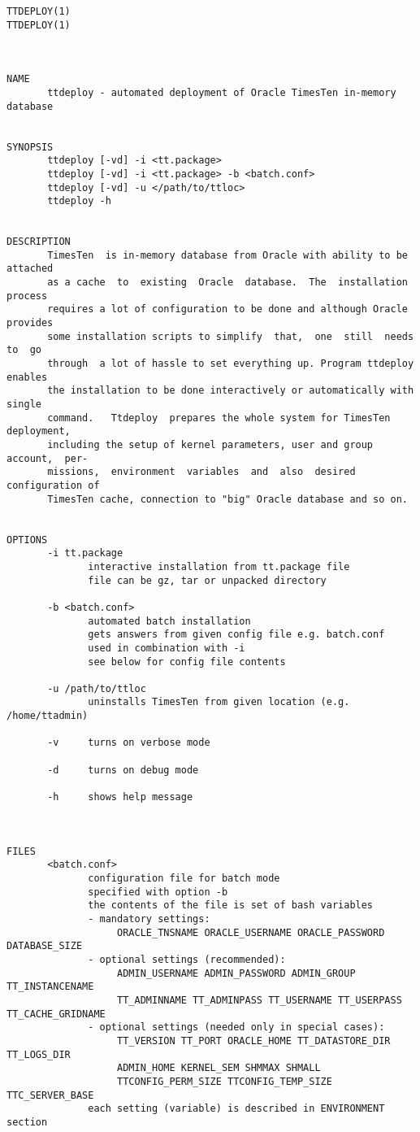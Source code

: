 \documentclass[11pt, letterpaper]{article}
\begin{document}
\begin{lstlisting}
TTDEPLOY(1)                                                        TTDEPLOY(1)



NAME
       ttdeploy - automated deployment of Oracle TimesTen in-memory database


SYNOPSIS
       ttdeploy [-vd] -i <tt.package>
       ttdeploy [-vd] -i <tt.package> -b <batch.conf>
       ttdeploy [-vd] -u </path/to/ttloc>
       ttdeploy -h


DESCRIPTION
       TimesTen  is in-memory database from Oracle with ability to be attached
       as a cache  to  existing  Oracle  database.  The  installation  process
       requires a lot of configuration to be done and although Oracle provides
       some installation scripts to simplify  that,  one  still  needs  to  go
       through  a lot of hassle to set everything up. Program ttdeploy enables
       the installation to be done interactively or automatically with  single
       command.   Ttdeploy  prepares the whole system for TimesTen deployment,
       including the setup of kernel parameters, user and group account,  per-
       missions,  environment  variables  and  also  desired  configuration of
       TimesTen cache, connection to "big" Oracle database and so on.


OPTIONS
       -i tt.package
              interactive installation from tt.package file
              file can be gz, tar or unpacked directory

       -b <batch.conf>
              automated batch installation
              gets answers from given config file e.g. batch.conf
              used in combination with -i
              see below for config file contents

       -u /path/to/ttloc
              uninstalls TimesTen from given location (e.g. /home/ttadmin)

       -v     turns on verbose mode

       -d     turns on debug mode

       -h     shows help message



FILES
       <batch.conf>
              configuration file for batch mode
              specified with option -b
              the contents of the file is set of bash variables
              - mandatory settings:
                   ORACLE_TNSNAME ORACLE_USERNAME ORACLE_PASSWORD DATABASE_SIZE
              - optional settings (recommended):
                   ADMIN_USERNAME ADMIN_PASSWORD ADMIN_GROUP TT_INSTANCENAME
                   TT_ADMINNAME TT_ADMINPASS TT_USERNAME TT_USERPASS TT_CACHE_GRIDNAME
              - optional settings (needed only in special cases):
                   TT_VERSION TT_PORT ORACLE_HOME TT_DATASTORE_DIR TT_LOGS_DIR
                   ADMIN_HOME KERNEL_SEM SHMMAX SHMALL
                   TTCONFIG_PERM_SIZE TTCONFIG_TEMP_SIZE TTC_SERVER_BASE
              each setting (variable) is described in ENVIRONMENT section


\end{lstlisting}
\end{document}

